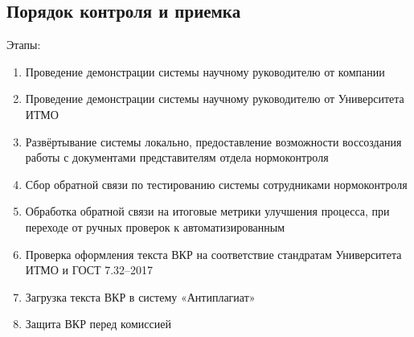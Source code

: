 \subsection{Порядок контроля и приемка}
Этапы:
\begin{enumerate}[label=\arabic*., nosep, leftmargin=*, labelindent=\parindent]
  \item Проведение демонстрации системы научному руководителю от компании
  \item Проведение демонстрации системы научному руководителю от Университета ИТМО
  \item Развёртывание системы локально, предоставление возможности воссоздания работы с документами представителям отдела нормоконтроля
  \item Сбор обратной связи по тестированию системы сотрудниками нормоконтроля
  \item Обработка обратной связи на итоговые метрики улучшения процесса, при переходе от ручных проверок к автоматизированным
  \item Проверка оформления текста ВКР на соответствие стандратам Университета ИТМО и ГОСТ 7.32–2017
  \item Загрузка текста ВКР в систему «Антиплагиат»
  \item Защита ВКР перед комиссией
\end{enumerate}
